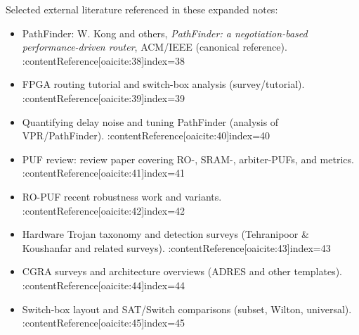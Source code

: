 \documentclass[11pt]{article}
\begin{document}
Selected external literature referenced in these expanded notes:
\begin{itemize}
  \item PathFinder: W. Kong and others, \emph{PathFinder: a negotiation-based performance-driven router}, ACM/IEEE (canonical reference). :contentReference[oaicite:38]{index=38}
  \item FPGA routing tutorial and switch-box analysis (survey/tutorial). :contentReference[oaicite:39]{index=39}
  \item Quantifying delay noise and tuning PathFinder (analysis of VPR/PathFinder). :contentReference[oaicite:40]{index=40}
  \item PUF review: review paper covering RO-, SRAM-, arbiter-PUFs, and metrics. :contentReference[oaicite:41]{index=41}
  \item RO-PUF recent robustness work and variants. :contentReference[oaicite:42]{index=42}
  \item Hardware Trojan taxonomy and detection surveys (Tehranipoor \& Koushanfar and related surveys). :contentReference[oaicite:43]{index=43}
  \item CGRA surveys and architecture overviews (ADRES and other templates). :contentReference[oaicite:44]{index=44}
  \item Switch-box layout and SAT/Switch comparisons (subset, Wilton, universal). :contentReference[oaicite:45]{index=45}
\end{itemize}
\end{document}
